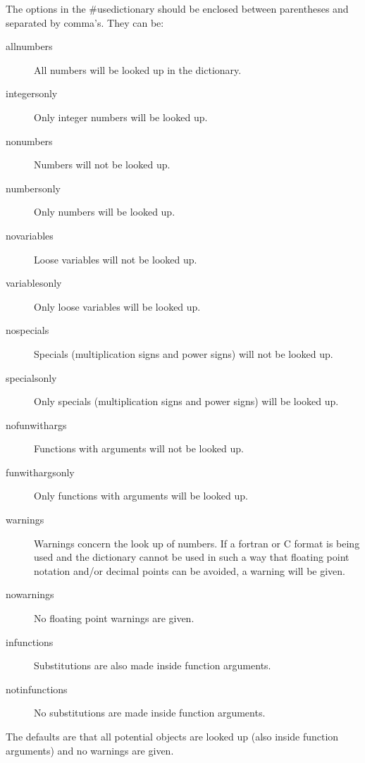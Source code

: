 The options in the \#usedictionary should be enclosed between parentheses 
and separated by comma's. They can be:
\begin{description}
\item[allnumbers]    All numbers will be looked up in the dictionary.
\item[integersonly]  Only integer numbers will be looked up.
\item[nonumbers]     Numbers will not be looked up.
\item[numbersonly]   Only numbers will be looked up.
\item[novariables]   Loose variables will not be looked up.
\item[variablesonly] Only loose variables will be looked up.
\item[nospecials]    Specials (multiplication signs and power signs) will 
not be looked up.
\item[specialsonly]  Only specials (multiplication signs and power signs) will 
be looked up.
\item[nofunwithargs] Functions with arguments will not be looked up.
\item[funwithargsonly] Only functions with arguments will be looked up.
\item[warnings]      Warnings concern the look up of 
numbers. If a fortran or C format is being used and the dictionary cannot 
be used in such a way that floating point notation and/or decimal points 
can be avoided, a warning will be given.
\item[nowarnings]    No floating point warnings are given.
\item[infunctions]   Substitutions are also made inside function arguments.
\item[notinfunctions] No substitutions are made inside function arguments.
\end{description}
The defaults are that all potential objects are looked up (also inside 
function arguments) and no warnings are given.

